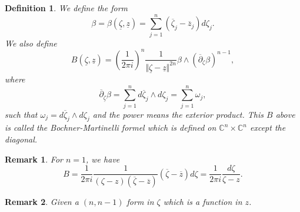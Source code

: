 \documentclass{article}
\newtheorem{definition}{Definition}[section]
\newtheorem{remark}{Remark}[section]
\newcommand{\norm}[1]{\Vert #1 \Vert}
\newcommand{\C}[0]{\mathbb{C}}
\begin{document}
\begin{definition}
  We define the form 
  \begin{equation*}
    \beta = \beta(\underline{\zeta},\underline{z}) = \sum_{j=1}^n (\overline{\zeta}_j-\overline{z}_j)d\zeta_j.
  \end{equation*}
  We also define 
  \begin{equation*}
    B(\underline{\zeta},\underline{z}) = \left({\frac 1 {2\pi i}}\right)^n{\frac {1} {\norm{\underline{\zeta}-\underline{z}}^{2n}}}\beta\wedge(\overline{\partial}_\zeta\beta)^{n-1},
  \end{equation*}
  where 
  \begin{equation*}
    \overline{\partial}_{\underline{\zeta}}\beta = \sum_{j=1}^n d\overline{\zeta}_j\wedge d\zeta_j = \sum_{j=1}^n \omega_j,
  \end{equation*}
  such that $\omega_j = d\overline{\zeta}_j\wedge d\zeta_j$ and the power means the exterior product. 
  This $B$ above is called the Bochner-Martinelli formel which is defined on $\C^n\times \C^n$ except the diagonal. 
\end{definition}

\begin{remark}
  For $n=1$, we have 
  \begin{equation*}
    B = {\frac 1 {2\pi i}}{\frac 1 {(\zeta-z)(\overline{\zeta}-\overline{z})}}(\overline{\zeta}-\overline{z})d\zeta = {\frac 1 {2\pi i}}{\frac {d\zeta} {\zeta - z}}.
  \end{equation*}
\end{remark}

\begin{remark}
  Given a $(n,n-1)$ form in $\zeta$ which is a function in $z$. 
\end{remark}
\end{document}
